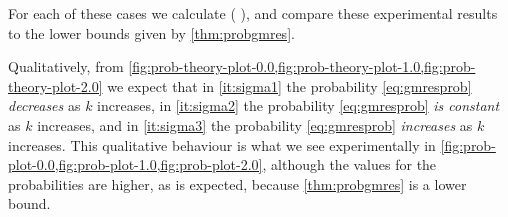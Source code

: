     For each of these cases we calculate
    \beq\label{eq:gmresprob}
    \PP\mleft(\GMRES{\eps}{\no}{\nt} \mright),
    \eeq
     and compare these experimental results to the lower bounds given by \cref{thm:probgmres}.

    Qualitatively, from \cref{fig:prob-theory-plot-0.0,fig:prob-theory-plot-1.0,fig:prob-theory-plot-2.0} we expect that in \cref{it:sigma1} the probability \cref{eq:gmresprob} \emph{decreases} as $k$ increases, in \cref{it:sigma2} the probability \cref{eq:gmresprob} \emph{is constant} as $k$ increases, and in \cref{it:sigma3} the probability \cref{eq:gmresprob} \emph{increases} as $k$ increases. This qualitative behaviour is what we see experimentally in \cref{fig:prob-plot-0.0,fig:prob-plot-1.0,fig:prob-plot-2.0}, although the values for the probabilities are higher, as is expected, because \cref{thm:probgmres} is a lower bound.

